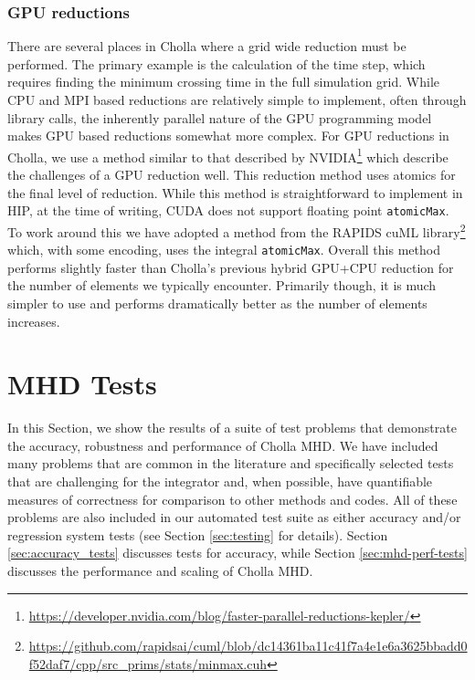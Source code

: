 \documentclass[modern]{aastex631}
\begin{document}
\subsubsection{GPU reductions}

There are several places in Cholla where a grid wide reduction must be performed. The primary example is the calculation of the time step, which requires finding the minimum crossing time in the full simulation grid. While CPU and MPI based reductions are relatively simple to implement, often through library calls, the inherently parallel nature of the GPU programming model makes GPU based reductions somewhat more complex. For GPU reductions in Cholla, we use a method similar to that described by NVIDIA\footnote{\url{https://developer.nvidia.com/blog/faster-parallel-reductions-kepler/}} which describe the challenges of a GPU reduction well. This reduction method uses atomics for the final level of reduction. While this method is straightforward to implement in HIP, at the time of writing, CUDA does not support floating point \texttt{atomicMax}. To work around this we have adopted a method from the RAPIDS cuML library\footnote{\url{https://github.com/rapidsai/cuml/blob/dc14361ba11c41f7a4e1e6a3625bbadd0f52daf7/cpp/src\_prims/stats/minmax.cuh}} which, with some encoding, uses the integral \texttt{atomicMax}. Overall this method performs slightly faster than Cholla's previous hybrid GPU+CPU reduction for the number of elements we typically encounter. Primarily though, it is much simpler to use and performs dramatically better as the number of elements increases.


\section{MHD Tests}
\label{sec:mhd-tests}

In this Section, we show the results of a suite of test problems that demonstrate the accuracy, robustness and performance of Cholla MHD. We have included many problems that are common in the literature and specifically selected tests that are challenging for the integrator and, when possible, have quantifiable measures of correctness for comparison to other methods and codes. All of these problems are also included in our automated test suite as either accuracy and/or regression system tests (see Section \ref{sec:testing} for details). Section \ref{sec:accuracy_tests} discusses tests for accuracy, while Section \ref{sec:mhd-perf-tests} discusses the performance and scaling of Cholla MHD.
\end{document}
